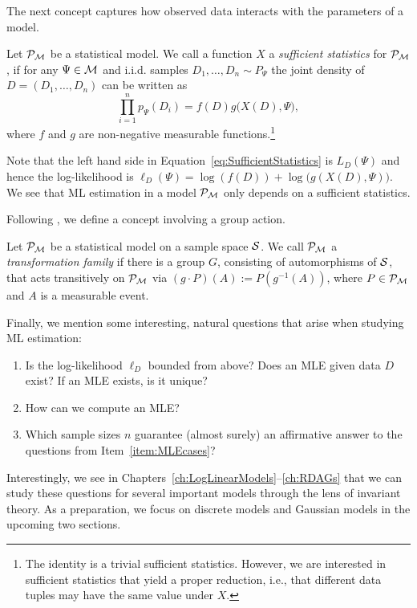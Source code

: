 The next concept captures how observed data interacts with the parameters of a model.

\begin{defn} \label{defn:SufficientStatistic}
	Let $\mathcal{P}_{\mathcal{M}}$ be a statistical model.
	We call a function $X$ a \emph{sufficient statistics} for $\mathcal{P}_{\mathcal{M}}$, if for any $\Psi \in \mathcal{M}$ and i.i.d. samples $D_1,\ldots,D_n \sim P_{\Psi}$
	the joint density of $D = (D_1,\ldots,D_n)$ can be written as
		\begin{equation}\label{eq:SufficientStatistics}
			 \prod_{i=1}^n p_{\Psi}(D_i) = f(D) g\big( X(D), \Psi \big) ,
		\end{equation}
	where $f$ and $g$ are non-negative measurable functions.\footnote{The identity is a trivial sufficient statistics. However, we are interested in sufficient statistics that yield a proper reduction, i.e., that different data tuples may have the same value under $X$.}
	\hfill{}
\end{defn}

Note that the left hand side in Equation~\eqref{eq:SufficientStatistics} is $L_{D}(\Psi)$ and hence the log-likelihood is $\ell_D(\Psi) = \log(f(D)) + \log\big( g(X(D),\Psi) \big)$. We see that ML estimation in a model $\mathcal{P}_{\mathcal{M}}$ only depends on a sufficient statistics.

Following \cite[Equation~(1.2)]{ExponentialTransformationModels}, we define a concept involving a group action.

\begin{defn} \label{defn:TransformationFamily}
	Let $\mathcal{P}_{\mathcal{M}}$ be a statistical model on a sample space $\mathcal{S}$. We call $\mathcal{P}_{\mathcal{M}}$ a \emph{transformation family} if there is a group $G$, consisting of automorphisms of $\mathcal{S}$, that acts transitively on $\mathcal{P}_{\mathcal{M}}$ via $(g \cdot P)(A) := P(g^{-1}(A))$, where $P \in \mathcal{P}_{\mathcal{M}}$ and $A$ is a measurable event.
	\hfill{}
\end{defn}

\medskip

Finally, we mention some interesting, natural questions that arise when studying ML estimation:
\begin{enumerate}
	\item\label{item:MLEcases} Is the log-likelihood $\ell_D$ bounded from above? Does an MLE given data $D$ exist? If an MLE exists, is it unique?
	\item\label{item:MLEcomputation} How can we compute an MLE?
	\item\label{item:MLthresholds} Which sample sizes $n$ guarantee (almost surely) an affirmative answer to the questions from Item~\ref{item:MLEcases}?
\end{enumerate}
Interestingly, we see in Chapters~\ref{ch:LogLinearModels}--\ref{ch:RDAGs} that we can study these questions for several important models through the lens of invariant theory. As a preparation, we focus on discrete models and Gaussian models in the upcoming two sections.



